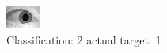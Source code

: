\begin{figure}[h!]
\begin{center}
\includegraphics[width=0.60\columnwidth]{figures/ID1489_class_2_target_1.png}
\end{center}
\caption{ Classification: 2 actual target: 1}
\label{fig:ID1489_class_2_target_1}
\end{figure}
